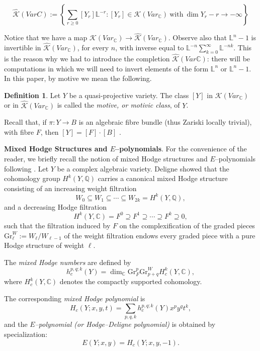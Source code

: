 \documentclass[12pt,reqno]{amsart}
\numberwithin{equation}{subsection}
\theoremstyle{definition}
\newtheorem{defn}[equation]{Definition}
\theoremstyle{theorem}
\begin{document}
\[\hat{\mathcal{K}}(VarC) := \left\{\sum_{r\geqslant 0}[Y_{r}]\mathbb{L}^{-r}: [Y_{r}]\in \mathcal{K}(Var_{\mathbb{C}}) \ \text{with} \ \dim Y_{r}-r\longrightarrow -\infty\right\}
\]

Notice that we have a map $\mathcal{K}(Var_{\mathbb{C}}) \rightarrow \hat{\mathcal{K}}(Var_{\mathbb{C}})$. Observe also that $\mathbb{L}^{n}-1$ is invertible in $\hat{\mathcal{K}}(Var_{\mathbb{C}})$, for every $n$, with
inverse equal to $\mathbb{L}^{-n}\sum_{k=0}^{\infty}\mathbb{L}^{-nk}$. This is the reason why we had to introduce the completion $\hat{\mathcal{K}}(Var\mathbb{C})$: there will be
computations in which we will need to invert elements of the form $\mathbb{L}^{n}$ or $\mathbb{L}^{n} - 1$.
In this paper, by motive we mean the following.

\begin{defn}
	Let $Y$ be a quasi-projective variety. The class $[Y]$ in $\mathcal{K}(Var_{\mathbb{C}})$ or in $\hat{\mathcal{K}}(Var_{\mathbb{C}})$ is called the \textit{motive, or motivic class}, of $Y$.
\end{defn}

Recall that, if $\pi: Y \rightarrow B$ is an algebraic fibre bundle (thus Zariski locally trivial), with fibre $F$, then $[Y] = [F] \cdot [B]$ .

\medskip

\noindent
\textbf{Mixed Hodge Structures and \(E\)--polynomials}.
For the convenience of the reader, we briefly recall the notion of mixed Hodge structures and \(E\)--polynomials following \cite[\S\,2]{Hausel-Rodriguez-2008}. Let \(Y\) be a complex algebraic variety. Deligne showed that the cohomology group \(H^{k}(Y,\mathbb{Q})\) carries a canonical mixed Hodge structure consisting of an increasing weight filtration
\[
W_{0}\subseteq W_{1}\subseteq \cdots \subseteq W_{2k}=H^{k}(Y,\mathbb{Q}),
\]
and a decreasing Hodge filtration
\[
H^{k}(Y,\mathbb{C})=F^{0}\supseteq F^{1}\supseteq \cdots \supseteq F^{k}\supseteq 0,
\]such that the filtration induced by $F$ on the complexification of the graded pieces $\text{Gr}^{W}_{\ell}:= W_{\ell}/W_{\ell - 1}$ of the
weight filtration endows every graded piece with a pure Hodge structure of weight $\ell$.

The \textit{mixed Hodge numbers} are defined by
\[
h^{p,q;k}_{c}(Y)
=
\dim_{\mathbb{C}}
\text{Gr}^{p}_{F}\text{Gr}^{W}_{p+q}H^{k}_{c}(Y,\mathbb{C}),
\]
where \(H^{k}_{c}(Y,\mathbb{C})\) denotes the compactly supported cohomology.

The corresponding \textit{mixed Hodge polynomial} is
\[
H_{c}(Y;x,y,t)
=
\sum_{p,q,k}
h^{p,q;k}_{c}(Y)x^{p}y^{q}t^{k},
\]
and the \textit{\(E\)--polynomial (or Hodge--Deligne polynomial)} is obtained by specialization:
\[
E(Y;x,y)
=
H_{c}(Y;x,y,-1).
\]
\end{document}

